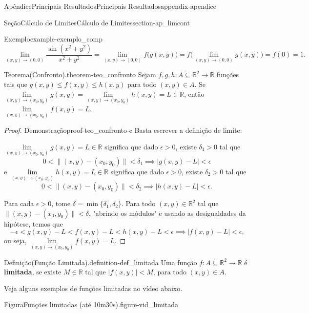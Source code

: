 \documentclass[oneside,10pt,]{book}
\newcommand{\terminology}[1]{\textbf{#1}}
\numberwithin{equation}{section}
\newcommand{\R}{\mathbb R}
\begin{document}
\begin{appendixptx}{Apêndice}{Principais Resultados}{}{Principais Resultados}{}{}{appendix-apendice}
\begin{sectionptx}{Seção}{Cálculo de Limites}{}{Cálculo de Limites}{}{}{section-ap_limcont}
\begin{example}{Exemplo}{}{example-exemplo_comp}
\begin{equation*}
\lim\limits_{(x,y)\to(0,0)}\dfrac{\sin(x^2+y^2)}{x^2+y^2}=\lim\limits_{(x,y)\to(0,0)}f\big(g(x,y)\big)=f\Big(\lim\limits_{(x,y)\to(0,0)}g(x,y)\Big)=f(0)=1.
\end{equation*}
\end{example}
\begin{theorem}{Teorema}{(Confronto).}{}{theorem-teo_confronto}%
Sejam \(f,g,h\colon A\subseteq\R^2\to\R\) funções tais que \(g(x,y)\leq f(x,y)\leq h(x,y)\) para todo \((x,y)\in
A\). Se \(\lim\limits_{(x,y)\to(x_0,y_0)}
g(x,y)=\lim\limits_{(x,y)\to(x_0,y_0)} h(x,y)=L\in\R\), então \(\lim\limits_{(x,y)\to(x_0,y_0)} f(x,y)=L\).%
\end{theorem}
\begin{proof}{Demonstração}{}{proof-teo_confronto-c}
Basta escrever a definição de limite:%
\par
\(\lim\limits_{(x,y)\to(x_0,y_0)}
g(x,y)=L\in\R\) significa que dado \(\epsilon>0\), existe \(\delta_1>0\) tal que%
\begin{equation*}
0<\|(x,y)-(x_0,y_0)\|<\delta_1 \implies
|g(x,y)-L|<\epsilon
\end{equation*}
e \(\lim\limits_{(x,y)\to(x_0,y_0)}
h(x,y)=L\in\R\) significa que dado \(\epsilon>0\), existe \(\delta_2>0\) tal que%
\begin{equation*}
0<\|(x,y)-(x_0,y_0)\|<\delta_2 \implies
|h(x,y)-L|<\epsilon\text{.}
\end{equation*}
%
\par
Para cada \(\epsilon>0\), tome \(\delta=\min\{\delta_1,\delta_2\}\). Para todo \((x,y)\in\R^2\) tal que \(\|(x,y)-(x_0,y_0)\|< \delta\), "abrindo os módulos" e usando as desigualdades da hipótese, temos que%
\begin{equation*}
-\epsilon<g(x,y)-L<f(x,y)-L<h(x,y)-L<\epsilon\implies
|f(x,y)-L|<\epsilon\text{,}
\end{equation*}
ou seja, \(\lim\limits_{(x,y)\to(x_0,y_0)} f(x,y)=L\).%
\end{proof}
\begin{definition}{Definição}{(Função Limitada).}{definition-def_limitada}%
Uma função \(f\colon A\subseteq\R^2\to\R\) é \terminology{limitada}, se existe \(M\in\R\) tal que \(|f(x,y)|< M\), para todo \((x,y)\in A\).%
\end{definition}
Veja alguns exemplos de funções limitadas no vídeo abaixo.%
\begin{figureptx}{Figura}{Funções limitadas (até 10m30s).}{figure-vid_limitada}{}%
\begin{sidebyside}{2}{0.075}{0.075}{0.17}%

\end{sidebyside}
\end{figureptx}
\end{sectionptx}
\end{appendixptx}
\end{document}
